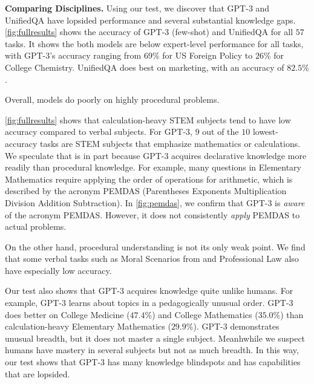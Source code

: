 \textbf{Comparing Disciplines.}\quad
Using our test, we discover that GPT-3 and UnifiedQA have lopsided performance and several substantial knowledge gaps. \ref{fig:fullresults} shows the accuracy of GPT-3 (few-shot) and UnifiedQA for all $57$ tasks. It shows the both models are below expert-level performance for all tasks, with GPT-3's accuracy ranging from $69\%$ for US Foreign Policy to $26\%$ for College Chemistry. UnifiedQA does best on marketing, with an accuracy of $82.5\%$.

Overall, models do poorly on highly procedural problems.

\ref{fig:fullresults} shows that calculation-heavy STEM subjects tend to have low accuracy compared to verbal subjects. For GPT-3, $9$ out of the $10$ lowest-accuracy tasks are STEM subjects that emphasize mathematics or calculations. We speculate that is in part because GPT-3 acquires declarative knowledge more readily than procedural knowledge. For example, many questions in Elementary Mathematics require applying the order of operations for arithmetic, which is described by the acronym PEMDAS (Parentheses Exponents Multiplication Division Addition Subtraction). In \ref{fig:pemdas}, we confirm that GPT-3 is \emph{aware} of the acronym PEMDAS. However, it does not consistently \emph{apply} PEMDAS to actual problems. 

On the other hand, procedural understanding is not its only weak point. We find that some verbal tasks such as Moral Scenarios from \cite{hendrycks2020ethicsdataset} and Professional Law also have especially low accuracy.

Our test also shows that GPT-3 acquires knowledge quite unlike humans. For example, GPT-3 learns about topics in a pedagogically unusual order. GPT-3 does better on College Medicine ($47.4\%$) and College Mathematics ($35.0\%$) than calculation-heavy Elementary Mathematics ($29.9\%$). GPT-3 demonstrates unusual breadth, but it does not master a single subject. Meanhwhile we suspect humans have mastery in several subjects but not as much breadth. In this way, our test shows that GPT-3 has many knowledge blindspots and has capabilities that are lopsided.

